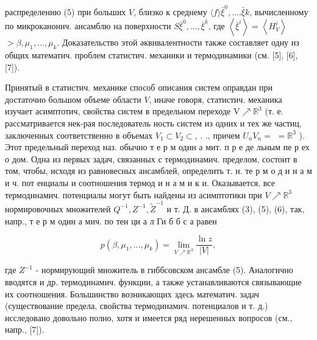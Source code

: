 \documentclass[10pt]{article}
\begin{document}
распределению (5) при больших $V$, близко к среднему $\langle f\rangle \bar{\xi}^{0}, \ldots . \bar{\xi} k$, вычисленному по микроканонич. ансамблю на поверхности $S \bar{\xi}^{0}, \ldots, \bar{\xi}^{k}$, где $\left\langle\bar{\xi}^{i}\right\rangle=\left\langle H_{V}^{i}\right\rangle$ $>\beta, \mu_{1}, \ldots, \mu_{k}$. Доказательство этой әквивалентности также составляет одну из общих математич. проблем статистич. механики и термодинамики (см. [5], [6], [7]).



Принятый в статистич. механике способ описания систем оправдан при достаточно большом объеме области $V$, иначе говоря, статистич. механика изучает асимптотич, свойства систем в предельном переходе $\mathrm{V} \nearrow \mathbb{R}^{3}$ (т. е. рассматривается нек-рая последователь ность систем из одних и тех же частиц, заключенных соответственно в объемах $V_{1} \subset V_{2} \subset$, . ., причем $U_{n} V_{n}=$ $=\mathbb{R}^{3}$ ). Этот предельный переход наз. обычно т е р м один а мит. п р е де льным пе р ех о дом. Одна из первых задач, связанных с термодинамич. пределом, состоит в том, чтобы, исходя из равновесных ансамблей, определить т. н. те р м о д и н а м и ч. пот енциалы и соотношения термод и н а м и к и. Оказывается, все термодинамич. потенциалы могут быть найдены из асимптотики при $V \nearrow \mathbb{R}^{3}$ нормировочных множителей $Q^{-1}, Z^{-1}, \tilde{Z}^{-1}$ и т. Д. в ансамблях (3), (5), (6), так, напр., т е р м один а мич. по тен ци а л Ги б б с а равен



\[

p\left(\beta, \mu_{1}, \ldots, \mu_{k}\right)=\lim _{V \nearrow \mathbb{R}^{3}} \frac{\ln z}{|V|},

\]



где $Z^{-1}$ - нормирующий множитель в гиббсовском ансамбле (5). Аналогично вводятся и др. термодинамич. функции, а также устанавливаются связывающие их соотношения. Большинство возникающих здесь математич. задач (существование предела, свойства термодинамич. потенциалов и т. д.) исследовано довольно полно, хотя и имеется ряд нерешенных вопросов (см., напр., [7]).
\end{document}
